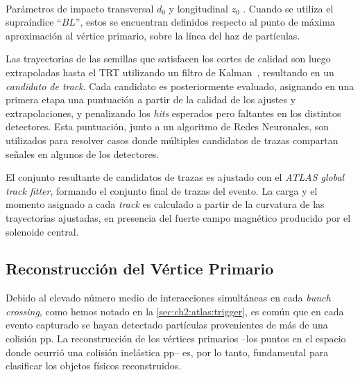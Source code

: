 \begin{marginfigure}
    \centering
    \subfloat[][\label{fig:ch3:tracks_impact-param:d0}]{}\\
    \subfloat[][\label{fig:ch3:tracks_impact-param:z0}]{}

    \caption{Parámetros de impacto transversal $d_0$  y longitudinal $z_0$ . Cuando se utiliza el supraíndice ``$BL$'', estos se encuentran definidos respecto al punto de máxima aproximación al vértice primario, sobre la línea del haz de partículas.}
    \label{fig:ch3:tracks_impact-param}
\end{marginfigure}

Las trayectorias de las semillas que satisfacen los cortes de calidad son luego extrapoladas hasta el TRT utilizando un filtro de Kalman~\cite{Fruhwirth1987}, resultando en un \textit{candidato de track}. Cada candidato es posteriormente evaluado, asignando en una primera etapa una puntuación a partir de la calidad de los ajustes y extrapolaciones, y penalizando los \textit{hits} esperados pero faltantes en los distintos detectores. Esta puntuación, junto a un algoritmo de Redes Neuronales, son utilizados para resolver casos donde múltiples candidatos de trazas compartan señales en algunos de los detectores.

El conjunto resultante de candidatos de trazas es ajustado con el \textit{ATLAS global track fitter}, formando el conjunto final de trazas del evento. La carga y el momento asignado a cada \textit{track} es calculado a partir de la curvatura de las trayectorias ajustadas, en presencia del fuerte campo magnético producido por el solenoide central.


\subsection{Reconstrucción del Vértice Primario}

Debido al elevado número medio de interacciones simultáneas en cada \textit{bunch crossing}, como hemos notado en la \cref{sec:ch2:atlas:trigger}, es común que en cada evento capturado se hayan detectado partículas provenientes de más de una colisión pp. La reconstrucción de los vértices primarios --los puntos en el espacio donde ocurrió una colisión inelástica pp-- es, por lo tanto, fundamental para clasificar los objetos físicos reconstruidos.

